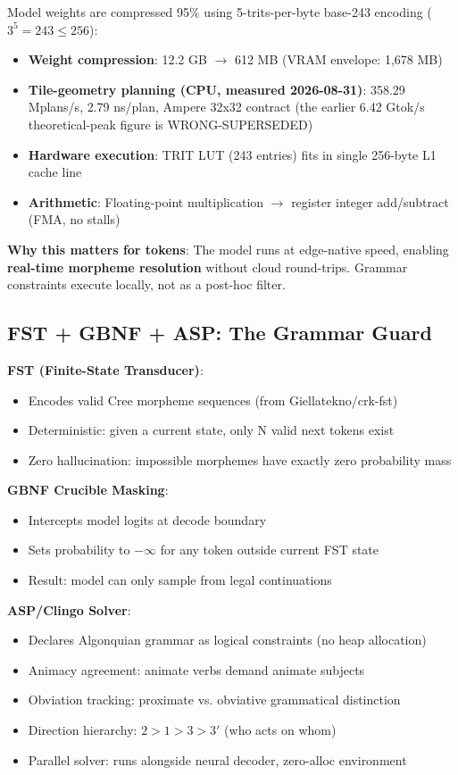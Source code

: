 \documentclass[11pt,oneside]{article}
\begin{document}
Model weights are compressed 95\% using 5-trits-per-byte base-243 encoding ($3^5 = 243 \leq 256$):

\begin{itemize}
  \item \textbf{Weight compression}: 12.2 GB $\to$ 612 MB (VRAM envelope: 1,678 MB)
  \item \textbf{Tile-geometry planning (CPU, measured 2026-08-31)}: 358.29 Mplans/s, 2.79 ns/plan, Ampere 32x32 contract (the earlier 6.42 Gtok/s theoretical-peak figure is WRONG-SUPERSEDED)
  \item \textbf{Hardware execution}: TRIT LUT (243 entries) fits in single 256-byte L1 cache line
  \item \textbf{Arithmetic}: Floating-point multiplication $\to$ register integer add/subtract (FMA, no stalls)
\end{itemize}

\textbf{Why this matters for tokens}: The model runs at edge-native speed, enabling \textbf{real-time morpheme resolution} without cloud round-trips. Grammar constraints execute locally, not as a post-hoc filter.

\subsection{FST + GBNF + ASP: The Grammar Guard}

\textbf{FST (Finite-State Transducer)}:
\begin{itemize}
  \item Encodes valid Cree morpheme sequences (from Giellatekno/crk-fst)
  \item Deterministic: given a current state, only N valid next tokens exist
  \item Zero hallucination: impossible morphemes have exactly zero probability mass
\end{itemize}

\textbf{GBNF Crucible Masking}:
\begin{itemize}
  \item Intercepts model logits at decode boundary
  \item Sets probability to $-\infty$ for any token outside current FST state
  \item Result: model can only sample from legal continuations
\end{itemize}

\textbf{ASP/Clingo Solver}:
\begin{itemize}
  \item Declares Algonquian grammar as logical constraints (no heap allocation)
  \item Animacy agreement: animate verbs demand animate subjects
  \item Obviation tracking: proximate vs. obviative grammatical distinction
  \item Direction hierarchy: $2 > 1 > 3 > 3'$ (who acts on whom)
  \item Parallel solver: runs alongside neural decoder, zero-alloc environment
\end{itemize}
\end{document}
